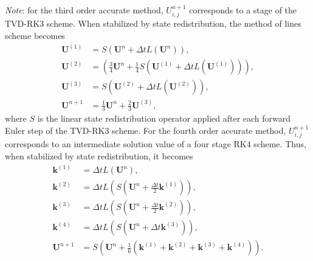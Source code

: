 \textit{Note}: for the third order accurate method, $U^{n+1}_{i,j}$ corresponds to a stage of the TVD-RK3 scheme.  
When stabilized by state redistribution, the method of lines scheme becomes
\begin{equation}\label{eq:molscheme_ho2_srd}
\begin{aligned}
\mathbf{U}^{(1)} &= S\left(\mathbf{U}^{n} + \Delta t L(\mathbf{U}^n) \right), \\
\mathbf{U}^{(2)} &=  \left(\frac{3}{4}\mathbf{U}^{n} + \frac{1}{4}S(\mathbf{U}^{(1)} + \Delta t L(\mathbf{U}^{(1)})) \right), \\
\mathbf{U}^{(3)} &= S\left(\mathbf{U}^{(2)} + \Delta t L(\mathbf{U}^{(2)}) \right),  \\
\mathbf{U}^{n+1} &= \frac{1}{3}\mathbf{U}^{n} + \frac{2}{3}\mathbf{U}^{(3)},	
\end{aligned}
\end{equation}
where $S$ is the linear state redistribution operator applied after each forward Euler step of the TVD-RK3 scheme.
For the fourth order accurate method, $U^{n+1}_{i,j}$ corresponds to an intermediate 
solution value of a four stage RK4 scheme.  Thus, when stabilized by state redistribution, 
it becomes 
\begin{equation}\label{eq:molscheme_ho4_srd}
\begin{aligned}
\mathbf{k}^{(1)} &= \Delta t L(\mathbf{U}^n), \\
\mathbf{k}^{(2)} &= \Delta t L \left(S\left(\mathbf{U}^n + \frac{\Delta t}{2} \mathbf{k}^{(1)}\right) \right), \\	
\mathbf{k}^{(3)} &= \Delta t L \left(S\left(\mathbf{U}^n + \frac{\Delta t}{2} \mathbf{k}^{(2)}\right) \right), \\	
\mathbf{k}^{(4)} &= \Delta t L \left(S\left(\mathbf{U}^n + \Delta t \mathbf{k}^{(3)} \right) \right), \\	
\mathbf{U}^{n+1} &= S\left(\mathbf{U}^n + \frac{1}{6}(\mathbf{k}^{(1)} + \mathbf{k}^{(2)}+ \mathbf{k}^{(3)}+ \mathbf{k}^{(4)})\right).
\end{aligned}
\end{equation}


